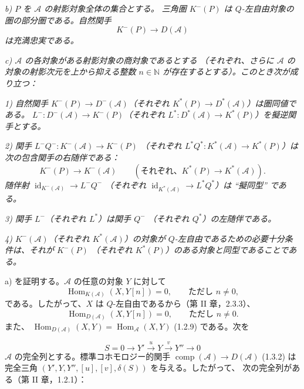 \clearpage
{}%
\begingroup\small\setlength{\parskip}{0pt}\setlength{\emergencystretch}{1.5em}
\setlength{\abovedisplayskip}{4pt plus 2pt minus 2pt}%
\setlength{\belowdisplayskip}{4pt plus 2pt minus 2pt}%

\noindent\textit{b) $P$ を $\mathcal A$ の射影対象全体の集合とする。
三角圏 $K^{-}(P)$ は $Q$-左自由対象の圏の部分圏である。自然関手}
\[
K^{-}(P)\longrightarrow D(\mathcal A)
\]
\noindent\textit{は充満忠実である。}

\noindent\textit{c) $\mathcal A$ の各対象がある射影対象の商対象であるとする
（それぞれ、さらに $\mathcal A$ の対象の射影次元を上から抑える整数
$n\in\mathbb N$ が存在するとする）。このとき次が成り立つ：}

\noindent\textit{1) 自然関手
$K^{-}(P)\longrightarrow D^{-}(\mathcal A)$（それぞれ
$K^{*}(P)\longrightarrow D^{*}(\mathcal A)$）は圏同値である。
$L^{-}\colon D^{-}(\mathcal A)\longrightarrow K^{-}(P)$（それぞれ
$L^{*}\colon D^{*}(\mathcal A)\longrightarrow K^{*}(P)$）を擬逆関手とする。}

\noindent\textit{2) 関手
$L^{-}Q^{-}\colon K^{-}(\mathcal A)\longrightarrow K^{-}(P)$
（それぞれ
$L^{*}Q^{*}\colon K^{*}(\mathcal A)\longrightarrow K^{*}(P)$）は次の包含関手の右随伴である：}
\[
K^{-}(P)\longrightarrow K^{-}(\mathcal A)
\qquad
(\text{それぞれ、}K^{*}(P)\longrightarrow K^{*}(\mathcal A)).
\]
\noindent\textit{随伴射
$\operatorname{id}_{K^{-}(\mathcal A)}\longrightarrow L^{-}Q^{-}$
（それぞれ
$\operatorname{id}_{K^{*}(\mathcal A)}\longrightarrow L^{*}Q^{*}$）は
``擬同型'' である。}

\noindent\textit{3) 関手 $L^{-}$（それぞれ $L^{*}$）は関手 $Q^{-}$
（それぞれ $Q^{*}$）の左随伴である。}

\noindent\textit{4) $K^{-}(\mathcal A)$（それぞれ $K^{*}(\mathcal A)$）の対象が
$Q$-左自由であるための必要十分条件は、それが $K^{-}(P)$
（それぞれ $K^{*}(P)$）のある対象と同型であることである。}

a) を証明する。$\mathcal A$ の任意の対象 $Y$ に対して
\[
\operatorname{Hom}_{K(\mathcal A)}(X,Y[n])=0,
\qquad\text{ただし }n\neq0,
\]
である。したがって、$X$ は $Q$-左自由であるから（第 II 章，2.3.3）、
\[
\operatorname{Hom}_{D(\mathcal A)}(X,Y[n])=0,
\qquad\text{ただし }n\neq0.
\]
また、
$\operatorname{Hom}_{D(\mathcal A)}(X,Y)
=\operatorname{Hom}_{\mathcal A}(X,Y)$ (1.2.9) である。次を

\[
S=0\longrightarrow Y'\xrightarrow{u}Y\xrightarrow{v}Y''
\longrightarrow0
\]
$\mathcal A$ の完全列とする。標準コホモロジー的関手
$\operatorname{comp}(\mathcal A)\longrightarrow D(\mathcal A)$ (1.3.2) は
完全三角 $(Y',Y,Y'',[u],[v],\delta(S))$ を与える。したがって、
次の完全列がある（第 II 章，1.2.1）：

